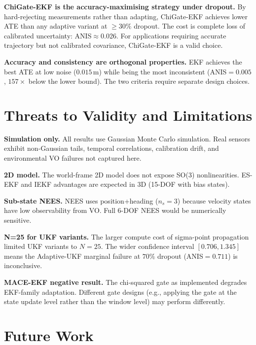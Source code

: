 \documentclass[letterpaper, 10pt, journal]{IEEEtran}
\begin{document}
\textbf{ChiGate-EKF is the accuracy-maximising strategy under dropout.}
By hard-rejecting measurements rather than adapting, ChiGate-EKF achieves
lower ATE than any adaptive variant at $\geq\!30\%$ dropout.
The cost is complete loss of calibrated uncertainty: ANIS$\approx$0.026.
For applications requiring accurate trajectory but not calibrated covariance,
ChiGate-EKF is a valid choice.

\textbf{Accuracy and consistency are orthogonal properties.}
EKF achieves the best ATE at low noise ($0.015$\,m) while being the most
inconsistent (ANIS$=0.005$, $157\times$ below the lower bound).
The two criteria require separate design choices.

\section{Threats to Validity and Limitations}
\label{sec:threats}

\textbf{Simulation only.} All results use Gaussian Monte Carlo simulation.
Real sensors exhibit non-Gaussian tails, temporal correlations, calibration
drift, and environmental VO failures not captured here.

\textbf{2D model.} The world-frame 2D model does not expose SO(3)
nonlinearities. ES-EKF and IEKF advantages are expected in 3D
(15-DOF with bias states).

\textbf{Sub-state NEES.} NEES uses position+heading ($n_s=3$) because
velocity states have low observability from VO. Full 6-DOF NEES would
be numerically sensitive.

\textbf{N=25 for UKF variants.} The larger compute cost of sigma-point
propagation limited UKF variants to $N=25$. The wider confidence interval
$[0.706,1.345]$ means the Adaptive-UKF marginal failure at $70\%$ dropout
(ANIS$=0.711$) is inconclusive.

\textbf{MACE-EKF negative result.} The chi-squared gate as implemented
degrades EKF-family adaptation. Different gate designs (e.g., applying
the gate at the state update level rather than the window level) may
perform differently.

\section{Future Work}
\label{sec:future}
\end{document}
